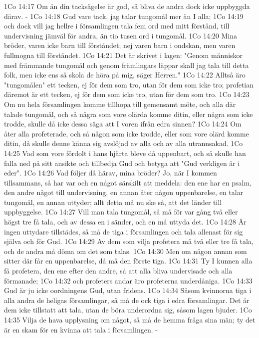 1Co 14:17  Om än din tacksägelse är god, så bliva de andra dock icke uppbyggda därav. -
1Co 14:18  Gud vare tack, jag talar tungomål mer än I alla;
1Co 14:19  och dock vill jag hellre i församlingen tala fem ord med mitt förstånd, till undervisning jämväl för andra, än tio tusen ord i tungomål.
1Co 14:20  Mina bröder, varen icke barn till förståndet; nej varen barn i ondskan, men varen fullmogna till förståndet.
1Co 14:21  Det är skrivet i lagen: "Genom människor med främmande tungomål och genom främlingars läppar skall jag tala till detta folk, men icke ens så skola de höra på mig, säger Herren."
1Co 14:22  Alltså äro "tungomålen" ett tecken, ej för dem som tro, utan för dem som icke tro; profetian däremot är ett tecken, ej för dem som icke tro, utan för dem som tro.
1Co 14:23  Om nu hela församlingen komme tillhopa till gemensamt möte, och alla där talade tungomål, och så några som vore olärda komme ditin, eller några som icke trodde, skulle då icke dessa säga att I voren ifrån edra sinnen?
1Co 14:24  Om åter alla profeterade, och så någon som icke trodde, eller som vore olärd komme ditin, då skulle denne känna sig avslöjad av alla och av alla utrannsakad.
1Co 14:25  Vad som vore fördolt i hans hjärta bleve då uppenbart, och så skulle han falla ned på sitt ansikte och tillbedja Gud och betyga att "Gud verkligen är i eder".
1Co 14:26  Vad följer då härav, mina bröder? Jo, när I kommen tillsammans, så har var och en något särskilt att meddela: den ene har en psalm, den andre något till undervisning, en annan åter någon uppenbarelse, en talar tungomål, en annan uttyder; allt detta må nu ske så, att det länder till uppbyggelse.
1Co 14:27  Vill man tala tungomål, så må för var gång två eller högst tre få tala, och av dessa en i sänder, och en må uttyda det.
1Co 14:28  Är ingen uttydare tillstädes, så må de tiga i församlingen och tala allenast för sig själva och för Gud.
1Co 14:29  Av dem som vilja profetera må två eller tre få tala, och de andra må döma om det som talas.
1Co 14:30  Men om någon annan som sitter där får en uppenbarelse, då må den förste tiga.
1Co 14:31  Ty I kunnen alla få profetera, den ene efter den andre, så att alla bliva undervisade och alla förmanade;
1Co 14:32  och profeters andar äro profeterna underdåniga.
1Co 14:33  Gud är ju icke oordningens Gud, utan fridens.
1Co 14:34  Såsom kvinnorna tiga i alla andra de heligas församlingar, så må de ock tiga i edra församlingar. Det är dem icke tillstatt att tala, utan de böra underordna sig, såsom lagen bjuder.
1Co 14:35  Vilja de hava upplysning om något, så må de hemma fråga sina män; ty det är en skam för en kvinna att tala i församlingen. -
